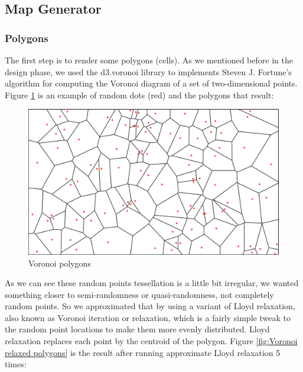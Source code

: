 \subsection{Map Generator}
\subsubsection{Polygons}
The first step is to render some polygons (cells). As we mentioned before in the design phase, we used the d3.voronoi library to implements Steven J. Fortune’s algorithm for computing the Voronoi diagram of a set of two-dimensional points. Figure \ref{fig:Voronoi polygons} is an example of random dots (red) and the polygons that result:

\begin{figure}[htbp]
\centering
\includegraphics[width=\textwidth]{section04/assets/Map-voronoi.png}
\caption[Voronoi polygons]{\label{fig:Voronoi polygons}Voronoi polygons}
\end{figure}

As we can see these random points tessellation is a little bit irregular, we wanted something closer to semi-randomness or quasi-randomness, not completely random points. So we approximated that by using a variant of Lloyd relaxation, also known as Voronoi iteration or relaxation, which is a fairly simple tweak to the random point locations to make them more evenly distributed. Lloyd relaxation replaces each point by the centroid of the polygon. Figure \ref{fig:Voronoi relaxed polygons} is the result after running approximate Lloyd relaxation 5 times:

